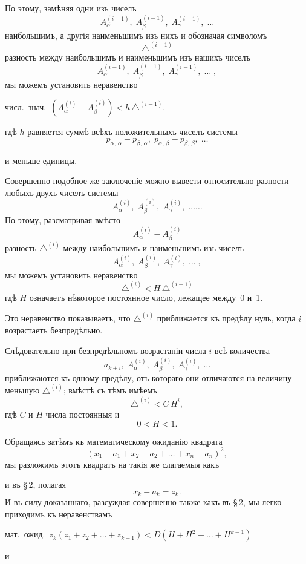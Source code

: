 \documentclass[12pt]{article}
\begin{document}
По этому, замѣняя одни изъ чиселъ
\[
A_{\alpha}^{(i-1)},\; A_{\beta}^{(i-1)},\; A_{\gamma}^{(i-1)},\;\ldots
\]
наибольшимъ, а другія наименьшимъ изъ нихъ и обозначая
символомъ
\[
\triangle^{(i-1)}
\]
разность между наибольшимъ и наименьшимъ изъ нашихъ
чиселъ
\[
A_{\alpha}^{(i-1)},\; A_{\beta}^{(i-1)},\; A_{\gamma}^{(i-1)},\;\ldots\;,
\]
мы можемъ установить неравенство

числ.\ знач.\ $(A_{\alpha}^{(i)} - A_{\beta}^{(i)}) < h\, \triangle^{(i-1)}$.

гдѣ $h$ равняется суммѣ всѣхъ положительныхъ чиселъ системы
\[
p_{\alpha,\,\alpha} - p_{\beta,\,\alpha},\; p_{\alpha,\,\beta} - p_{\beta,\,\beta},\;\ldots
\]


и меньше единицы.

Совершенно подобное же заключеніе можно вывести от\-носительно разности любыхъ двухъ чиселъ системы
\[
A_{\alpha}^{(i)},\; A_{\beta}^{(i)},\; A_{\gamma}^{(i)},\;\ldots\ldots
\]
По этому, разсматривая вмѣсто
\[
A_{\alpha}^{(i)} - A_{\beta}^{(i)}
\]
разность $\triangle^{(i)}$ между наибольшимъ и наименьшимъ изъ чиселъ
\[
A_{\alpha}^{(i)},\; A_{\beta}^{(i)},\; A_{\gamma}^{(i)},\;\ldots\;,
\]
мы можемъ установить неравенство
\[
\triangle^{(i)} < H\,\triangle^{(i-1)}
\]
гдѣ $H$ означаетъ нѣкоторое постоянное число, лежащее меж\-ду~0 и~1.

Это неравенство показываетъ, что $\triangle^{(i)}$ приближается къ
предѣлу нуль, когда $i$ возрастаетъ безпредѣльно.

Слѣдовательно при безпредѣльномъ возрастаніи числа $i$
всѣ количества
\[
a_{k+i},\; A_{\alpha}^{(i)},\; A_{\beta}^{(i)},\; A_{\gamma}^{(i)},\;\ldots
\]
приближаются къ одному предѣлу, отъ котораго они отли\-чаются на величину меньшую $\triangle^{(i)}$; вмѣстѣ съ тѣмъ имѣемъ
\[
\triangle^{(i)} < C\, H^i,
\]
гдѣ $C$ и $H$ числа постоянныя и
\[
0 < H < 1.
\]

Обращаясь затѣмъ къ математическому ожиданію квадрата
\[
(x_1 - a_1 + x_2 - a_2 + \ldots + x_n - a_n)^2,
\]
мы разложимъ этотъ квадратъ на такія же слагаемыя какъ


и въ \S\,2, полагая
\[
x_k - a_k = z_k.
\]
И въ силу доказаннаго, разсуждая совершенно также какъ въ
\S\,2, мы легко приходимъ къ неравенствамъ

мат.\ ожид.\ $z_k(z_1 + z_2 + \ldots + z_{k-1}) < D(H + H^2 + \ldots + H^{k-1})$

\noindent и
\end{document}
